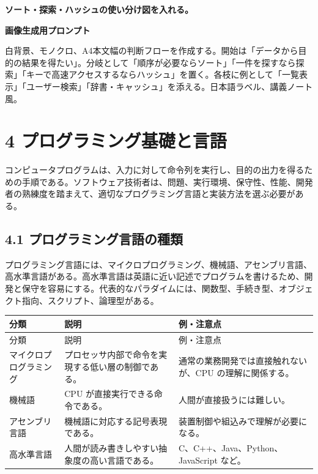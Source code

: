 \documentclass[a4paper,11pt]{ltjsarticle}
\begin{document}
\begin{todobox}
\textbf{ソート・探索・ハッシュの使い分け図を入れる。}\par
\textbf{画像生成用プロンプト}\par
白背景、モノクロ、A4本文幅の判断フローを作成する。開始は「データから目的の結果を得たい」。分岐として「順序が必要ならソート」「一件を探すなら探索」「キーで高速アクセスするならハッシュ」を置く。各枝に例として「一覧表示」「ユーザー検索」「辞書・キャッシュ」を添える。日本語ラベル、講義ノート風。

\end{todobox}

\section{4 プログラミング基礎と言語}

コンピュータプログラムは、入力に対して命令列を実行し、目的の出力を得るための手順である。ソフトウェア技術者は、問題、実行環境、保守性、性能、開発者の熟練度を踏まえて、適切なプログラミング言語と実装方法を選ぶ必要がある。

\subsection{4.1 プログラミング言語の種類}

プログラミング言語には、マイクロプログラミング、機械語、アセンブリ言語、高水準言語がある。高水準言語は英語に近い記述でプログラムを書けるため、開発と保守を容易にする。代表的なパラダイムには、関数型、手続き型、オブジェクト指向、スクリプト、論理型がある。

\begin{longtable}{>{\raggedright\arraybackslash}p{}>{\raggedright\arraybackslash}p{}>{\raggedright\arraybackslash}p{}}
\toprule
分類 & 説明 & 例・注意点 \\
\midrule
\endfirsthead
\toprule
分類 & 説明 & 例・注意点 \\
\midrule
\endhead
マイクロプログラミング & プロセッサ内部で命令を実現する低い層の制御である。 & 通常の業務開発では直接触れないが、CPU の理解に関係する。 \\
機械語 & CPU が直接実行できる命令である。 & 人間が直接扱うには難しい。 \\
アセンブリ言語 & 機械語に対応する記号表現である。 & 装置制御や組込みで理解が必要になる。 \\
高水準言語 & 人間が読み書きしやすい抽象度の高い言語である。 & C、C++、Java、Python、JavaScript など。 \\
\bottomrule
\end{longtable}
\end{document}
